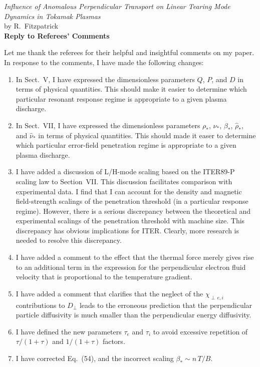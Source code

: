 \documentclass{article}[12pt]
\begin{document}
\begin{center}
{\em  Influence of Anomalous Perpendicular Transport on Linear Tearing Mode Dynamics in Tokamak Plasmas}\\[1ex]
by R.~Fitzpatrick\\[1ex]
{\bf Reply to Referees' Comments}
\end{center}
Let me thank the  referees for their helpful and insightful comments on my paper. In response to the
comments, I have made the following changes:
\begin{enumerate}
\item In Sect.~V, I have expressed the dimensionless parameters $Q$, $P$, and $D$ in terms of
physical quantities. This should make it easier to determine which particular resonant response regime is
appropriate to a given plasma discharge. 
\item In Sect.~VII, I have expressed the dimensionless parameters $\rho_\ast$,
$\nu_\ast$, $\beta_\ast$, $\hat{\rho}_\ast$, and $\hat{\nu}_\ast$ in terms of physical quantities. 
This should made it easer to determine which particular error-field penetration regime is appropriate to
a given plasma discharge.
\item I have added a discussion of L/H-mode scaling based on the ITER89-P scaling law to Section~VII. This discussion facilitates comparison with
experimental data. I find that I can account for the density and magnetic field-strength scalings of
the penetration threshold (in a particular response regime). However, there is a serious discrepancy between
the theoretical and experimental scalings of the penetration threshold with machine size. This
discrepancy has obvious implications for ITER. Clearly, more research is needed to resolve this discrepancy.
\item I have added a comment to the effect that the thermal force merely gives rise to an additional term
in the expression for the perpendicular electron fluid velocity that is proportional to the temperature gradient.
\item I have added a comment that clarifies that the neglect of the $\chi_{\perp\,e,i}$ contributions to
$D_\perp$ leads to the erroneous prediction that the perpendicular particle diffusivity is much smaller than the
perpendicular energy diffusivity. 
\item I have defined the new parameters $\tau_e$ and $\tau_i$ to avoid excessive repetition
of $\tau/(1+\tau)$ and $1/(1+\tau)$ factors.
\item I have corrected Eq.~(54), and the incorrect scaling $\beta_\ast\sim n\,T/B$. 

\end{enumerate}
\end{document}
